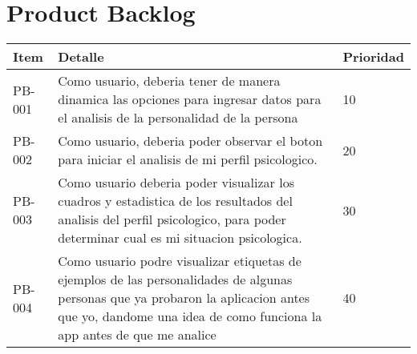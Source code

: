 \chapter{Product Backlog}

\begin{table}[htbp]
	\begin{center}
		\begin{tabular}{|p{1.5cm} | p{12cm} | p{2cm} |}
			\hline
			Item & Detalle & Prioridad  \\
			\hline
			PB-001 & Como usuario, deberia tener de manera dinamica las opciones para ingresar datos para el analisis de la personalidad de la persona & 10  \\
			\hline
			PB-002 & Como usuario, deberia  poder observar el boton para iniciar el	analisis de mi perfil psicologico.& 20 \\
			\hline
			PB-003 & Como usuario deberia poder visualizar los cuadros y estadistica de los resultados del analisis del perfil psicologico, para poder determinar cual es mi
			situacion psicologica. & 30  \\
			\hline
			PB-004 & Como usuario podre visualizar etiquetas de ejemplos de las personalidades de algunas personas que ya probaron la aplicacion antes que yo, dandome una idea de como funciona la app antes de que me analice & 40 \\
			\hline	
		\end{tabular}
	\end{center}
\end{table}
